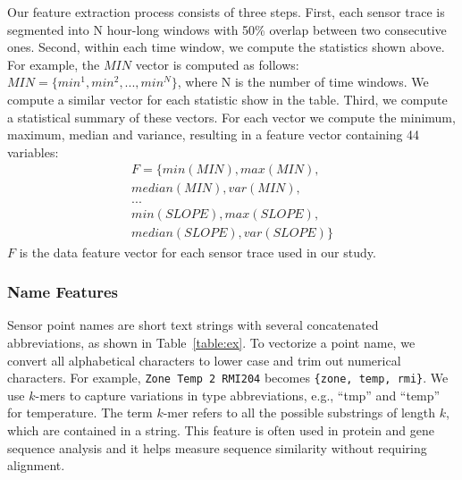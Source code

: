 Our feature extraction process consists of three steps.
First, each sensor trace is segmented into N hour-long windows with 50\% overlap between two consecutive ones. Second, within each time window, we compute the statistics shown above. 
For example, the $MIN$ vector is computed as follows: 
$MIN = \{min^{1}, min^{2}, ..., min^{N}\}$, where N is the number of time windows. We compute a similar vector for each statistic show in the table.
Third, we compute a statistical summary of these vectors. For each vector we compute the minimum, maximum, median and variance, resulting in a feature 
vector containing 44 variables:
\begin{displaymath}
\begin{split}
F = \{min(MIN), max(MIN), \\ 
median(MIN), var(MIN),\\
...\\
min(SLOPE), max(SLOPE), \\
median(SLOPE), var(SLOPE)\}
\end{split}
\end{displaymath}
$F$ is the data feature vector for each sensor trace used in our study.


\subsubsection{Name Features}
Sensor point names are short text strings with several concatenated abbreviations, as shown in Table~\ref{table:ex}. 
To vectorize a point name, we convert all alphabetical characters to lower case and trim out numerical characters. 
For example, \texttt{Zone Temp 2 RMI204} becomes \texttt{\{zone, temp, rmi\}}. 
We use $k$-mers \cite{leslie2004mismatch} to capture variations in type abbreviations, e.g., ``tmp'' and ``temp'' for temperature.
The term $k$-mer refers to all the possible substrings of length $k$, which are contained in a string. This feature is often used in protein and gene sequence analysis and 
it helps measure sequence similarity without requiring alignment. 

